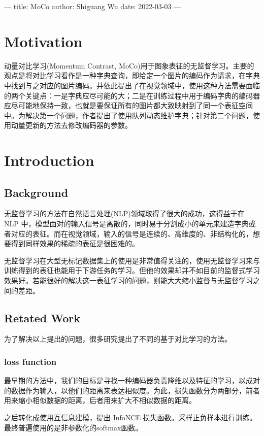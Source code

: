 ---
title: MoCo
author: Shiguang Wu
date: 2022-03-03
---



\section{Motivation}

动量对比学习(Momentum Contrast, MoCo)用于图象表征的无监督学习。主要的观点是将对比学习看作是一种字典查询，即给定一个图片的编码作为请求，在字典中找到与之对应的图片编码。并依此提出了在视觉领域中，使用这种方法需要面临的两个关键点：一是字典应尽可能的大；二是在训练过程中用于编码字典的编码器应尽可能地保持一致，也就是要保证所有的图片都大致映射到了同一个表征空间中。为解决第一个问题，作者提出了使用队列动态维护字典；针对第二个问题，使用动量更新的方法去修改编码器的参数。

\section{Introduction}
\subsection{Background}
无监督学习的方法在自然语言处理(NLP)领域取得了很大的成功，这得益于在 NLP 中，模型面对的输入信号是离散的，同时易于分割成小的单元来建造字典或者对应的表征。而在视觉领域，输入的信号是连续的、高维度的、非结构化的，想要得到同样效果的稀疏的表征是很困难的。

无监督学习在大型无标记数据集上的使用是非常值得关注的，使用无监督学习来与训练得到的表征也能用于下游任务的学习。但他的效果却并不如目前的监督式学习效果好。若能很好的解决这一表征学习的问题，则能大大缩小监督与无监督学习之间的差距。

\subsection{Retated Work}

为了解决以上提出的问题，很多研究提出了不同的基于对比学习的方法。
\subsubsection{loss function}
最早期的方法中，我们的目标是寻找一种编码器负责降维以及特征的学习，以成对的数据作为输入，以他们的距离来表达相似度。为此，损失函数分为两部分，前者用来缩小相似数据的距离，后者用来扩大不相似数据的距离。

之后转化成使用互信息建模，提出 InfoNCE 损失函数。采样正负样本进行训练。最终普遍使用的是非参数化的softmax函数。

